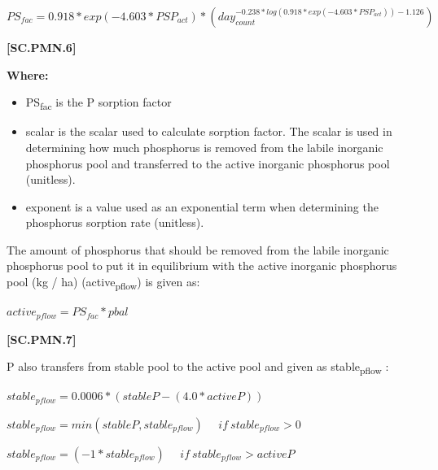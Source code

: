     \begin{center}
\(PS_{fac} = 0.918 * exp(-4.603* PSP_{act})* (day_{count}^{-0.238*log(0.918 * exp(-4.603* PSP_{act}))-1.126})\)
\vspace{0.1cm}
    \end{center}
        \vspace{0.5cm} 
    
            {\raggedleft \textbf{[SC.PMN.6]}\par}
            \vspace{0.5cm}

        \textbf{Where:}
            
        \begin{itemize}
            \item PS\textsubscript{fac} is the P sorption factor
            \item scalar is the scalar used to calculate sorption factor. The scalar is used in determining how much phosphorus is removed from the labile inorganic phosphorus pool and transferred to the active inorganic phosphorus pool (unitless).
            \item exponent is a value used as an exponential term when determining the phosphorus sorption rate (unitless).
        \end{itemize}
        \vspace{0.5cm}

The amount of phosphorus that should be removed from the labile inorganic phosphorus pool to put it in equilibrium with the active inorganic phosphorus pool (kg / ha) (active\textsubscript{pflow}) is given as:
            \vspace{0.5cm}

    \begin{center}
\(active_{pflow} = PS_{fac}* pbal\)
    \end{center}
        \vspace{0.5cm} 
    
            {\raggedleft \textbf{[SC.PMN.7]}\par}
            \vspace{0.5cm}

P also transfers from stable pool to the active pool and given as stable\textsubscript{pflow} :
            \vspace{0.5cm}

    \begin{center}
\(stable_{pflow} = 0.0006* (stableP - (4.0* activeP))\)
\vspace{0.1cm}

\(stable_{pflow} = min(stableP,stable_{pflow})\ \ \ \ \ \  if\ stable_{pflow} > 0\)
\vspace{0.1cm}

\(stable_{pflow} = (-1*stable_{pflow})\ \ \ \ \ \  if\ stable_{pflow} > activeP\)
    \end{center}
        \vspace{0.5cm} 
    
